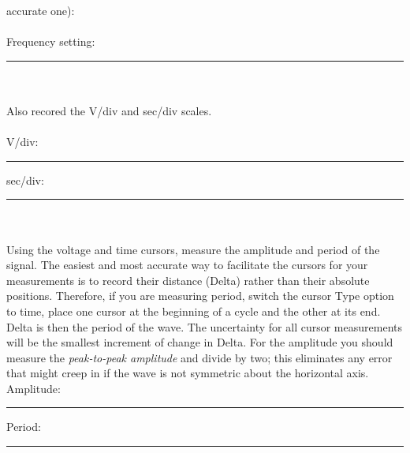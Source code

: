 accurate one): \\
\\
Frequency setting: \rule{3cm}{.1mm}\\
\\
Also recored the V/div and sec/div scales.\\
\\
V/div:  \rule{3cm}{.1mm} \hspace*{1cm} sec/div: \rule{3cm}{.1mm}\\
\\
Using the voltage and time cursors, measure the amplitude and period of the
signal. The easiest and most accurate way to facilitate the cursors for your
measurements is to record their distance (Delta) rather than their absolute
positions. Therefore, if you are measuring period, switch the cursor Type
option to time, place one cursor at the beginning of a cycle and the other at
its end. Delta is then the period of the wave. The uncertainty for all cursor
measurements will be the smallest increment of change in Delta. For the
amplitude you should measure the {\it peak-to-peak amplitude} and divide by
two; this eliminates any error that might creep in if the wave is not symmetric
about the horizontal axis.
\\
\vfill
Amplitude:  \rule{3cm}{.1mm} \hspace*{1cm} Period: \rule{3cm}{.1mm}\\
\pagebreak

